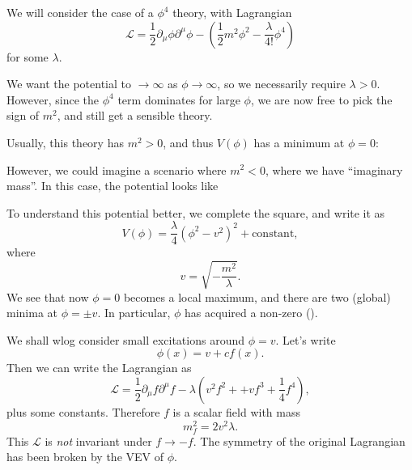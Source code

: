 \documentclass[a4paper]{article}
\begin{document}
We will consider the case of a $\phi^4$ theory, with Lagrangian
\[
  \mathcal{L} = \frac{1}{2} \partial_\mu \phi \partial^\mu \phi - \left(\frac{1}{2} m^2 \phi^2 - \frac{\lambda}{4!} \phi^4\right)
\]
for some $\lambda$.

We want the potential to $\to \infty$ as $\phi \to \infty$, so we necessarily require $\lambda > 0$. However, since the $\phi^4$ term dominates for large $\phi$, we are now free to pick the sign of $m^2$, and still get a sensible theory.

Usually, this theory has $m^2 > 0$, and thus $V(\phi)$ has a minimum at $\phi = 0$:
\begin{center}
\end{center}
However, we could imagine a scenario where $m^2 < 0$, where we have ``imaginary mass''. In this case, the potential looks like
\begin{center}
\end{center}
To understand this potential better, we complete the square, and write it as
\[
  V(\phi) = \frac{\lambda}{4} (\phi^2 - v^2)^2 + \text{constant},
\]
where
\[
  v = \sqrt{-\frac{m^2}{\lambda}}.
\]
We see that now $\phi = 0$ becomes a local maximum, and there are two (global) minima at $\phi = \pm v$. In particular, $\phi$ has acquired a non-zero  ().

We shall wlog consider small excitations around $\phi = v$. Let's write
\[
  \phi(x) = v + cf(x).
\]
Then we can write the Lagrangian as
\[
  \mathcal{L} = \frac{1}{2} \partial_\mu f \partial^\mu f - \lambda \left(v^2 f^2 + + vf^3 + \frac{1}{4} f^4\right),
\]
plus some constants. Therefore $f$ is a scalar field with mass
\[
  m_f^2 = 2v^2 \lambda.
\]
This $\mathcal{L}$ is \emph{not} invariant under $f \to -f$. The symmetry of the original Lagrangian has been broken by the VEV of $\phi$.
\end{document}
